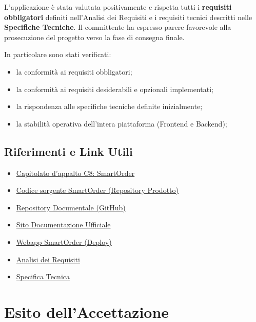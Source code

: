 \documentclass[a4paper, 11pt, oneside]{scrartcl}
\begin{document}
L'applicazione è stata valutata positivamente e rispetta tutti i \textbf{requisiti obbligatori} definiti nell'Analisi dei Requisiti e i requisiti tecnici descritti nelle \textbf{Specifiche Tecniche}. Il committente ha espresso parere favorevole alla prosecuzione del progetto verso la fase di consegna finale.

In particolare sono stati verificati:
\begin{itemize}
    \item la conformità ai requisiti obbligatori;
    \item la conformità ai requisiti desiderabili e opzionali implementati;
    \item la rispondenza alle specifiche tecniche definite inizialmente;
    \item la stabilità operativa dell'intera piattaforma (Frontend e Backend);
\end{itemize}

\subsection{Riferimenti e Link Utili}
\begin{itemize}
    \item \href{https://www.math.unipd.it/~tullio/IS-1/2025/Progetto/C8.pdf}{Capitolato d'appalto C8: SmartOrder}
    \item \href{https://github.com/swenightpro/SmartOrder-MVP}{Codice sorgente SmartOrder (Repository Prodotto)}
    \item \href{https://github.com/swenightpro/Documentazione}{Repository Documentale (GitHub)}
    \item \href{https://swenightpro.github.io/Documentazione/}{Sito Documentazione Ufficiale}
    \item \href{https://frontend-production-afc4.up.railway.app/}{Webapp SmartOrder (Deploy)}
    \item \href{https://swenightpro.github.io/Documentazione/docs/PB/Documentazione%20Esterna/Analisi_Dei_Requisiti.pdf}{Analisi dei Requisiti}
    \item \href{https://swenightpro.github.io/Documentazione/docs/PB/Documentazione%20Esterna/Specifica_Tecnica.pdf}{Specifica Tecnica}
\end{itemize}

\section{Esito dell'Accettazione}
\end{document}
